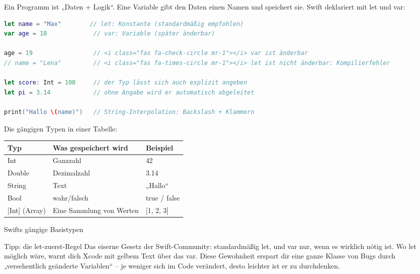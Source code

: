 


Ein Programm ist „Daten + Logik“. Eine Variable gibt den Daten einen Namen und speichert sie. Swift deklariert mit let und var:

\begin{lstlisting}[language=Swift]
let name = "Max"        // let: Konstante (standardmäßig empfohlen)
var age = 18             // var: Variable (später änderbar)

age = 19                 // <i class="fas fa-check-circle mr-1"></i> var ist änderbar
// name = "Lena"         // <i class="fas fa-times-circle mr-1"></i> let ist nicht änderbar: Kompilierfehler

let score: Int = 100     // der Typ lässt sich auch explizit angeben
let pi = 3.14            // ohne Angabe wird er automatisch abgeleitet

print("Hallo \(name)")   // String-Interpolation: Backslash + Klammern
\end{lstlisting}

Die gängigen Typen in einer Tabelle:

\begin{center}
\begin{tabularx}{\linewidth}{|X|X|X|}
\hline
\textbf{Typ} & \textbf{Was gespeichert wird} & \textbf{Beispiel} \tabularnewline
\hline
Int & Ganzzahl & 42 \tabularnewline
Double & Dezimalzahl & 3.14 \tabularnewline
String & Text & „Hallo“ \tabularnewline
Bool & wahr/falsch & true / false \tabularnewline
{}[Int] (Array) & Eine Sammlung von Werten & {}[1, 2, 3] \tabularnewline
\hline
\end{tabularx}
\end{center}

\begin{center}\small\color{gray}Swifts gängige Basistypen\end{center}

\begin{tcbinfo}{Tipp: die let-zuerst-Regel}
Das eiserne Gesetz der Swift-Community: standardmäßig let, und var nur, wenn es wirklich nötig ist. Wo let möglich wäre, warnt dich Xcode mit gelbem Text über das var. Diese Gewohnheit erspart dir eine ganze Klasse von Bugs durch „versehentlich geänderte Variablen“ – je weniger sich im Code verändert, desto leichter ist er zu durchdenken.

\end{tcbinfo}

